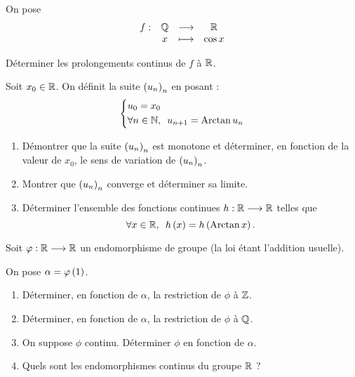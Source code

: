 \begin{exo}[Exercice 5]
On pose \[\begin{array}[t]{cccc}f : & \mathbb{Q} & \longrightarrow & \mathbb{R} \\ & x & \longmapsto & \cos x\end{array}\]

Déterminer les prolongements continus de \(f\) à \(\mathbb{R}\).
\end{exo}

\begin{corr}
\end{corr}

\begin{exo}
Soit \(x_0\in\mathbb{R}\). On définit la suite \(\left(u_n\right)_n\) en posant : \[\begin{dcases}u_0=x_0 \\ \quantifs{\forall n\in\N}u_{n+1}=\Arctan u_n\end{dcases}\]

\begin{enumerate}
\item Démontrer que la suite \(\left(u_n\right)_n\) est monotone et déterminer, en fonction de la valeur de \(x_0\), le sens de variation de \(\left(u_n\right)_n\). \\

\item Montrer que \(\left(u_n\right)_n\) converge et déterminer sa limite. \\

\item Déterminer l'ensemble des fonctions continues \(h:\mathbb{R}\longrightarrow\mathbb{R}\) telles que \[\quantifs{\forall x\in\R}h\paren{x}=h\paren{\Arctan x}.\]
\end{enumerate}
\end{exo}

\begin{corr}
\end{corr}

\begin{exo}[Exercice 7]
Soit \(\varphi:\mathbb{R}\longrightarrow\mathbb{R}\) un endomorphisme de groupe (la loi étant l'addition usuelle).

On pose \(\alpha=\varphi\left(1\right)\).

\begin{enumerate}
\item Déterminer, en fonction de \(\alpha\), la restriction de \(\phi\) à \(\mathbb{Z}\). \\

\item Déterminer, en fonction de \(\alpha\), la restriction de \(\phi\) à \(\mathbb{Q}\). \\

\item On suppose \(\phi\) continu. Déterminer \(\phi\) en fonction de \(\alpha\). \\

\item Quels sont les endomorphismes continus du groupe \(\mathbb{R}\) ?
\end{enumerate}
\end{exo}

